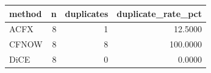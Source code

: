 \begin{tabular}{lrrr}
\toprule
method &  n &  duplicates &  duplicate\_rate\_pct \\
\midrule
  ACFX &  8 &           1 &             12.5000 \\
 CFNOW &  8 &           8 &            100.0000 \\
  DiCE &  8 &           0 &              0.0000 \\
\bottomrule
\end{tabular}
